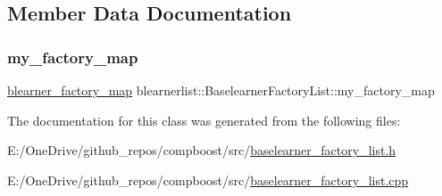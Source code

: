 \subsection{Member Data Documentation}
\mbox{\label{classblearnerlist_1_1_baselearner_factory_list_a839e9b3f1bf73e995c35f7a6d0f64113}} 
\subsubsection{\texorpdfstring{my\+\_\+factory\+\_\+map}{my\_factory\_map}}
{\footnotesize\ttfamily \mbox{\hyperlink{baselearner__factory__list_8h_a058570e00ae11b882cfed36eb40be025}{blearner\+\_\+factory\+\_\+map}} blearnerlist\+::\+Baselearner\+Factory\+List\+::my\+\_\+factory\+\_\+map\hspace{0.3cm}{\ttfamily [private]}}



The documentation for this class was generated from the following files\+:\begin{DoxyCompactItemize}
\item 
E\+:/\+One\+Drive/github\+\_\+repos/compboost/src/\mbox{\hyperlink{baselearner__factory__list_8h}{baselearner\+\_\+factory\+\_\+list.\+h}}\item 
E\+:/\+One\+Drive/github\+\_\+repos/compboost/src/\mbox{\hyperlink{baselearner__factory__list_8cpp}{baselearner\+\_\+factory\+\_\+list.\+cpp}}\end{DoxyCompactItemize}

